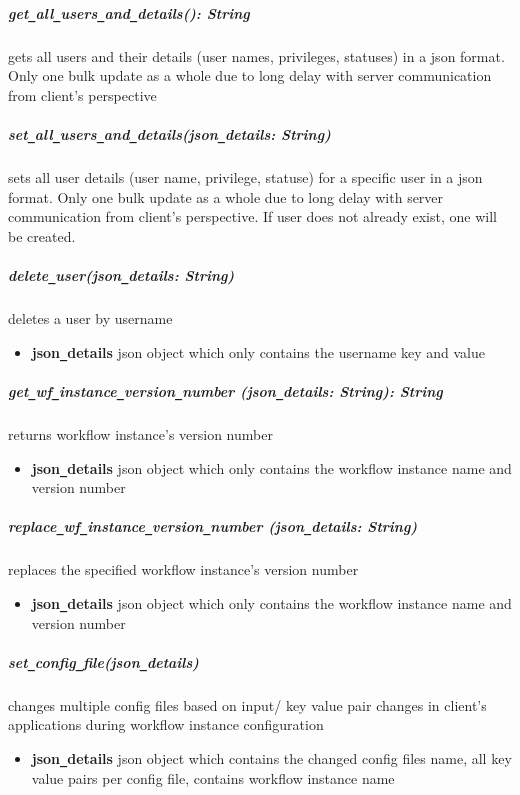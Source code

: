 \subparagraph{get\texttt{\_}all\texttt{\_}users\texttt{\_}and\texttt{\_}details(): String}
gets all users and their details (user names, privileges, statuses) in a json format. Only one bulk update as a whole
due to long delay with server communication from client's perspective


\subparagraph{set\texttt{\_}all\texttt{\_}users\texttt{\_}and\texttt{\_}details(json\texttt{\_}details: String)}
sets all user details (user name, privilege, statuse) for a specific user in a json format. Only one bulk update as a whole
due to long delay with server communication from client's perspective. If user does not already exist, one will be created.

\subparagraph{delete\texttt{\_}user(json\texttt{\_}details: String)}
deletes a user by username
\begin{itemize}
        \item \textbf{json\texttt{\_}details}
        json object which only contains the username key and value
\end{itemize}


\subparagraph{get\texttt{\_}wf\texttt{\_}instance\texttt{\_}version\texttt{\_}number
(json\texttt{\_}details: String): String}
returns workflow instance's version number 
\begin{itemize}
        \item \textbf{json\texttt{\_}details}
        json object which only contains the workflow instance name and version number 
\end{itemize}

\subparagraph{replace\texttt{\_}wf\texttt{\_}instance\texttt{\_}version\texttt{\_}number
(json\texttt{\_}details: String)}
replaces the specified workflow instance's version number 
\begin{itemize}
        \item \textbf{json\texttt{\_}details}
        json object which only contains the workflow instance name and version number
\end{itemize}


\subparagraph{set\texttt{\_}config\texttt{\_}file(json\texttt{\_}details)}
changes multiple config files based on input/ key value pair changes in client's applications during workflow instance 
configuration
\begin{itemize}
        \item \textbf{json\texttt{\_}details}
        json object which contains the changed config files name, 
        all key value pairs per config file, 
        contains workflow instance name
\end{itemize}

